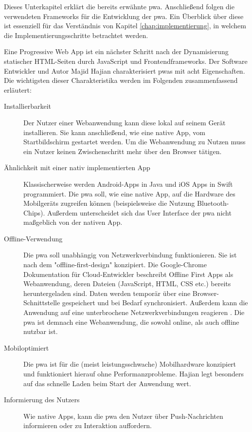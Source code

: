 Dieses Unterkapitel erklärt die bereits erwähnte \acf{pwa}. Anschließend folgen die verwendeten Frameworks für die Entwicklung der \ac{pwa}. Ein Überblick über diese ist essenziell für das Verständnis von Kapitel \ref{chap:implementierung}, in welchem die Implementierungsschritte betrachtet werden.

Eine Progressive Web App ist ein nächster Schritt nach der Dynamisierung statischer HTML-Seiten durch JavaScript und Frontendframeworks. Der Software Entwickler und Autor Majid Hajian charakterisiert \ac{pwa}s mit acht Eigenschaften. Die wichtigsten dieser Charakteristika werden im Folgenden zusammenfassend erläutert:


\begin{description}
  \item [Installierbarkeit]
	  Der Nutzer einer Webanwendung kann diese lokal auf seinem Gerät installieren. Sie kann anschließend, wie eine native App, vom Startbildschirm gestartet werden. Um die Webanwendung zu Nutzen muss ein Nutzer keinen Zwischenschritt mehr über den Browser tätigen.
  
  \item [Ähnlichkeit mit einer nativ implementierten App]  
 	 Klassischerweise werden Android-Apps in Java und iOS Apps in Swift programmiert. Die \ac{pwa} soll, wie eine native App, auf die Hardware des Mobilgeräts zugreifen können (beispielsweise die Nutzung Bluetooth-Chips). Außerdem unterscheidet sich das User Interface der \ac{pwa} nicht maßgeblich von der nativen App. 
  
  \item [Offline-Verwendung] 
  	Die \ac{pwa} soll unabhängig von Netzwerkverbindung funktionieren. Sie ist nach dem "offline-first-design" konzipiert. Die Google-Chrome Dokumentation für Cloud-Entwickler beschreibt Offline First Apps als Webanwendung, deren Dateien (JavaScript, HTML, CSS etc.) bereits heruntergeladen sind. Daten werden temporär über eine Browser-Schnittstelle gespeichert und bei Bedarf synchronisiert. Außerdem kann die Anwendung auf eine unterbrochene Netzwerkverbindungen reagieren \cite{GoogleOfflineApps}. Die \ac{pwa} ist demnach eine Webanwendung, die sowohl online, als auch offline nutzbar ist.

  \item [Mobiloptimiert]  
  	Die \ac{pwa} ist für die (meist leistungsschwache) Mobilhardware konzipiert und funktioniert hierauf ohne Performanzprobleme. Hajian legt besonders auf das schnelle Laden beim Start der Anwendung wert.
  	
  \item [Informierung des Nutzers] 
  	Wie native Apps, kann die \ac{pwa} den Nutzer über Push-Nachrichten informieren oder zu Interaktion auffordern.
\end{description}

